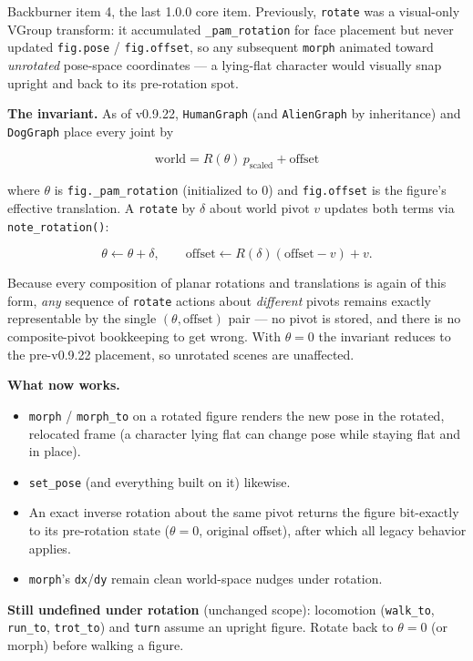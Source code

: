 \documentclass[
  12pt,
  letterpaper,
]{book}
\begin{document}
Backburner item 4, the last 1.0.0 core item. Previously,
\texttt{rotate} was a visual-only VGroup transform: it accumulated
\texttt{\_pam\_rotation} for face placement but never updated
\texttt{fig.pose} / \texttt{fig.offset}, so any subsequent
\texttt{morph} animated toward \emph{unrotated} pose-space
coordinates --- a lying-flat character would visually snap upright
and back to its pre-rotation spot.

\textbf{The invariant.} As of v0.9.22, \texttt{HumanGraph} (and
\texttt{AlienGraph} by inheritance) and \texttt{DogGraph} place every
joint by

\[ \mathrm{world} = R(\theta)\, p_{\mathrm{scaled}} + \mathrm{offset} \]

where $\theta$ is \texttt{fig.\_pam\_rotation} (initialized to $0$)
and \texttt{fig.offset} is the figure's effective translation. A
\texttt{rotate} by $\delta$ about world pivot $v$ updates both terms
via \texttt{note\_rotation()}:

\[ \theta \leftarrow \theta + \delta, \qquad
\mathrm{offset} \leftarrow R(\delta)(\mathrm{offset} - v) + v . \]

Because every composition of planar rotations and translations is
again of this form, \emph{any} sequence of \texttt{rotate} actions
about \emph{different} pivots remains exactly representable by the
single $(\theta, \mathrm{offset})$ pair --- no pivot is stored, and
there is no composite-pivot bookkeeping to get wrong. With
$\theta = 0$ the invariant reduces to the pre-v0.9.22 placement, so
unrotated scenes are unaffected.

\textbf{What now works.}

\begin{itemize}
\item
  \texttt{morph} / \texttt{morph\_to} on a rotated figure renders the
  new pose in the rotated, relocated frame (a character lying flat
  can change pose while staying flat and in place).
\item
  \texttt{set\_pose} (and everything built on it) likewise.
\item
  An exact inverse rotation about the same pivot returns the figure
  bit-exactly to its pre-rotation state ($\theta = 0$, original
  offset), after which all legacy behavior applies.
\item
  \texttt{morph}'s \texttt{dx}/\texttt{dy} remain clean world-space
  nudges under rotation.
\end{itemize}

\textbf{Still undefined under rotation} (unchanged scope):
locomotion (\texttt{walk\_to}, \texttt{run\_to}, \texttt{trot\_to})
and \texttt{turn} assume an upright figure. Rotate back to
$\theta = 0$ (or morph) before walking a figure.
\end{document}
